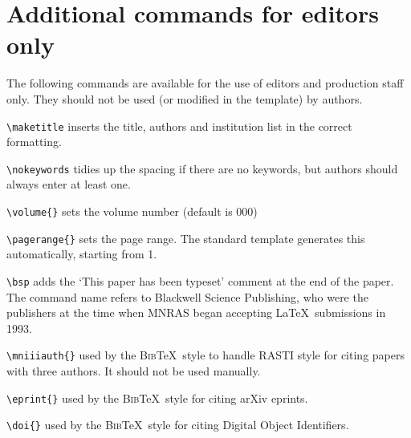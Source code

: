 \documentclass[fleqn,usenatbib,useAMS]{rasti}
\newcommand{\bibtex}{\textsc{Bib}\!\TeX} %
\begin{document}
\section{Additional commands for editors only}
The following commands are available for the use of editors and production staff only.
They should not be used (or modified in the template) by authors.

\begin{description}
 \item \verb'\maketitle' inserts the title, authors and institution list in the correct formatting.
 \item \verb'\nokeywords' tidies up the spacing if there are no keywords, but authors should always enter at least one.
 \item \verb'\volume{}' sets the volume number (default is 000)
 \item \verb'\pagerange{}' sets the page range. The standard template generates this automatically, starting from 1.
 \item \verb'\bsp' adds the `This paper has been typeset\textellipsis' comment at the end of the paper.
The command name refers to Blackwell Science Publishing, who were the publishers at the time when MNRAS began accepting \LaTeX\ submissions in 1993.
 \item \verb'\mniiiauth{}' used by the \bibtex\ style to handle RASTI style for citing papers with three authors. It should not be used manually.
 \item \verb'\eprint{}' used by the \bibtex\ style for citing arXiv eprints.
 \item \verb'\doi{}' used by the \bibtex\ style for citing Digital Object Identifiers.
\end{description}



\bsp	%
\label{lastpage}
\end{document}
